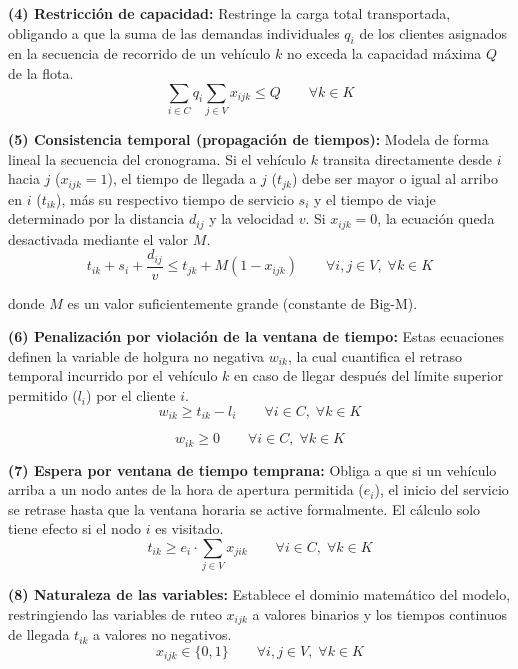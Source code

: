 \documentclass[letter, 10pt, dvipdfmx]{article}
\begin{document}
\textbf{(4) Restricción de capacidad:} Restringe la carga total transportada, obligando a que la suma de las demandas individuales $q_i$ de los clientes asignados en la secuencia de recorrido de un vehículo $k$ no exceda la capacidad máxima $Q$ de la flota.
\begin{equation}
  \sum_{i \in C} q_i \sum_{j \in V} x_{ijk} \leq Q \qquad \forall k \in K
\end{equation}

\textbf{(5) Consistencia temporal (propagación de tiempos):} Modela de forma lineal la secuencia del cronograma. Si el vehículo $k$ transita directamente desde $i$ hacia $j$ ($x_{ijk} = 1$), el tiempo de llegada a $j$ ($t_{jk}$) debe ser mayor o igual al arribo en $i$ ($t_{ik}$), más su respectivo tiempo de servicio $s_i$ y el tiempo de viaje determinado por la distancia $d_{ij}$ y la velocidad $v$. Si $x_{ijk} = 0$, la ecuación queda desactivada mediante el valor $M$.
\begin{equation}
  t_{ik} + s_i + \frac{d_{ij}}{v} \leq t_{jk} + M(1 - x_{ijk}) \qquad \forall i,j \in V,\; \forall k \in K
\end{equation}

donde $M$ es un valor suficientemente grande (constante de Big-M).

\textbf{(6) Penalización por violación de la ventana de tiempo:} Estas ecuaciones definen la variable de holgura no negativa $w_{ik}$, la cual cuantifica el retraso temporal incurrido por el vehículo $k$ en caso de llegar después del límite superior permitido ($l_i$) por el cliente $i$.
\begin{equation}
  w_{ik} \geq t_{ik} - l_i \qquad \forall i \in C,\; \forall k \in K
\end{equation}

\begin{equation}
  w_{ik} \geq 0 \qquad \forall i \in C,\; \forall k \in K
\end{equation}

\textbf{(7) Espera por ventana de tiempo temprana:} Obliga a que si un vehículo arriba a un nodo antes de la hora de apertura permitida ($e_i$), el inicio del servicio se retrase hasta que la ventana horaria se active formalmente. El cálculo solo tiene efecto si el nodo $i$ es visitado.
\begin{equation}
  t_{ik} \geq e_i \cdot \sum_{j \in V} x_{jik} \qquad \forall i \in C,\; \forall k \in K
\end{equation}

\textbf{(8) Naturaleza de las variables:} Establece el dominio matemático del modelo, restringiendo las variables de ruteo $x_{ijk}$ a valores binarios y los tiempos continuos de llegada $t_{ik}$ a valores no negativos.
\begin{equation}
  x_{ijk} \in \{0,1\} \qquad \forall i,j \in V,\; \forall k \in K
\end{equation}
\end{document}
